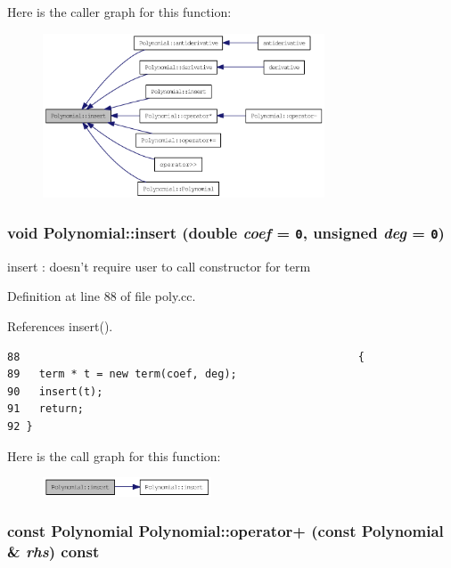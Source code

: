 Here is the caller graph for this function:\nopagebreak
\begin{figure}[H]
\begin{center}
\leavevmode
\includegraphics[width=237pt]{classPolynomial_b141080a5700f160d4bd1d68cecfd50f_icgraph}
\end{center}
\end{figure}
\hypertarget{classPolynomial_47a8de184c159d413235dbb3a192554d}{
\subsubsection[insert]{\setlength{\rightskip}{0pt plus 5cm}void Polynomial::insert (double {\em coef} = {\tt 0}, \/  unsigned {\em deg} = {\tt 0})}}
\label{classPolynomial_47a8de184c159d413235dbb3a192554d}


insert : doesn't require user to call constructor for term 

Definition at line 88 of file poly.cc.

References insert().

\begin{Code}\begin{verbatim}88                                                     {
89   term * t = new term(coef, deg);
90   insert(t);
91   return;
92 }
\end{verbatim}
\end{Code}




Here is the call graph for this function:\nopagebreak
\begin{figure}[H]
\begin{center}
\leavevmode
\includegraphics[width=142pt]{classPolynomial_47a8de184c159d413235dbb3a192554d_cgraph}
\end{center}
\end{figure}
\hypertarget{classPolynomial_74b75f9d3274a46baa91c84fc5aad1f8}{
\subsubsection[operator+]{\setlength{\rightskip}{0pt plus 5cm}const {\bf Polynomial} Polynomial::operator+ (const {\bf Polynomial} \& {\em rhs}) const}}
\label{classPolynomial_74b75f9d3274a46baa91c84fc5aad1f8}


